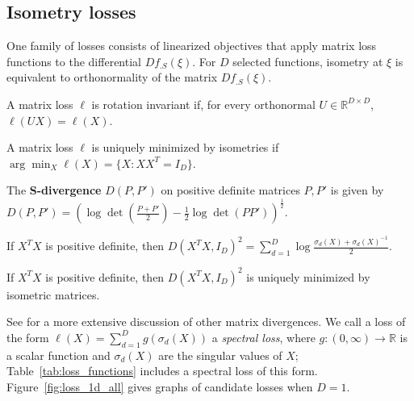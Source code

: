 \subsection{Isometry losses}

One family of losses consists of linearized objectives that apply matrix loss functions to the differential $Df_{.S}(\xi)$.
For $D$ selected functions, isometry at $\xi$ is equivalent to orthonormality of the matrix $Df_{.S}(\xi)$.

\begin{property}
\label{property:rotation_invariance}
A matrix loss $\ell$ is rotation invariant if, for every orthonormal $U \in \mathbb R^{D \times D}$, $\ell(UX) = \ell(X)$.
\end{property}

\begin{property}
\label{property:unique_isometry_minimum}
A matrix loss $\ell$ is uniquely minimized by isometries if $\arg \min_X \ell(X) = \{X : XX^T = I_D\}$.
\end{property}

\begin{definition}{\citet{Sra2011-sdivergence}}
The \textbf{S-divergence} $D(P,P')$ on positive definite matrices $P,P'$ is given by $D(P,P') = (\log \det (\frac{P + P'}{2}) - \frac{1}{2}\log \det(PP'))^{\frac{1}{2}}$.
\end{definition}
\begin{proposition}
\label{prop:sdiv_singular_values}
If $X^T X$ is positive definite, then $D(X^T X,I_D)^2 = \sum_{d=1}^D \log \frac{\sigma_d(X) + \sigma_d(X)^{-1}}{2}$.
\end{proposition}
\begin{proposition}
\label{prop:sdiv_minimized_by_isometries}
If $X^T X$ is positive definite, then $D(X^T X,I_D)^2$ is uniquely minimized by isometric matrices.
\end{proposition}
See \citep{Cichocki2014-logdet} for a more extensive discussion of other matrix divergences.
We call a loss of the form $\ell(X)=\sum_{d=1}^D g(\sigma_d(X))$ a \emph{spectral loss}, where $g:(0,\infty)\to\mathbb R$ is a scalar function and $\sigma_d(X)$ are the singular values of $X$; Table~\ref{tab:loss_functions} includes a spectral loss of this form.
Figure~\ref{fig:loss_1d_all} gives graphs of candidate losses when $D=1$.
